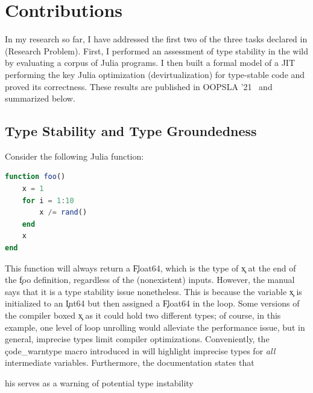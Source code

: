 
%
%
%





\chapter{Contributions}%
\label{chap-contrib}

In my research so far, I have addressed the first two of the three tasks
declared in  (Research Problem). First, I performed an
assessment of type stability in the wild by evaluating a corpus of Julia programs.
%
I then built a formal model of a JIT performing the key Julia optimization
(devirtualization) for type-stable code and proved its correctness. These
results are published in OOPSLA '21~\cite{Pelenitsyn21} and summarized below.


\section{Type Stability and Type Groundedness}%
\label{sec:ts-tg}

Consider the following Julia function:
\begin{lstlisting}[language=julia]
function foo()
    x = 1
    for i = 1:10
        x /= rand()
    end
    x
end
\end{lstlisting}
This function will always return a \c{Float64}, which is the type of \c{x} at
the end of the \c{foo} definition, regardless of the (nonexistent) inputs.
However, the manual says that it is a type stability issue nonetheless. This is
because the variable \c{x} is initialized to an \c{Int64} but then assigned a
\c{Float64} in the loop. Some versions of the compiler boxed \c{x} as it could
hold two different types; of course, in this example, one level of loop
unrolling would alleviate the performance issue, but in general, imprecise types
limit compiler optimizations. Conveniently, the \c{code_warntype} macro
introduced in  will highlight imprecise types for
\emph{all} intermediate variables. Furthermore, the documentation states that
\begin{itquote}
  [t]his serves as a warning of potential type instability
\end{itquote}

